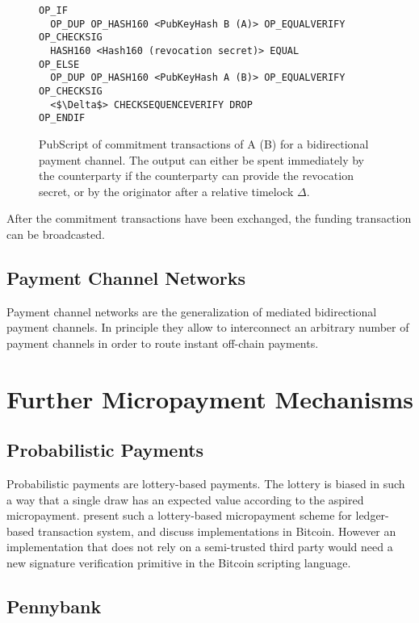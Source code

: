 \begin{figure}
\begin{lstlisting}[breaklines,mathescape=true]
OP_IF
  OP_DUP OP_HASH160 <PubKeyHash B (A)> OP_EQUALVERIFY OP_CHECKSIG
  HASH160 <Hash160 (revocation secret)> EQUAL
OP_ELSE
  OP_DUP OP_HASH160 <PubKeyHash A (B)> OP_EQUALVERIFY OP_CHECKSIG
  <$\Delta$> CHECKSEQUENCEVERIFY DROP
OP_ENDIF
\end{lstlisting} 
\caption{PubScript of commitment transactions of A (B) for a bidirectional payment channel. The output can either be spent immediately by the counterparty if the counterparty can provide the revocation secret, or by the originator after a relative timelock $\Delta$.}
\label{fig:pubScriptCommitment}
\end{figure}

After the commitment transactions have been exchanged, the funding transaction can be broadcasted. 

\subsection{Payment Channel Networks}
\label{sec:paymentchannelnetworks}

Payment channel networks are the generalization of mediated bidirectional payment channels. In principle they allow to interconnect an arbitrary number of payment channels in order to route instant off-chain payments. 


\section{Further Micropayment Mechanisms}

\subsection{Probabilistic Payments}

Probabilistic payments \cite{wheeler1996transactions,rivest1996payword,rivest1997electronic} are lottery-based payments. The lottery is biased in such a way that a single draw has an expected value according to the aspired micropayment.
\cite{Pass:2015:MDC:2810103.2813713} present such a lottery-based micropayment scheme for ledger-based transaction system, and discuss implementations in Bitcoin. However an implementation that does not rely on a semi-trusted third party would need a new signature verification primitive in the Bitcoin scripting language. 

\subsection{Pennybank}

